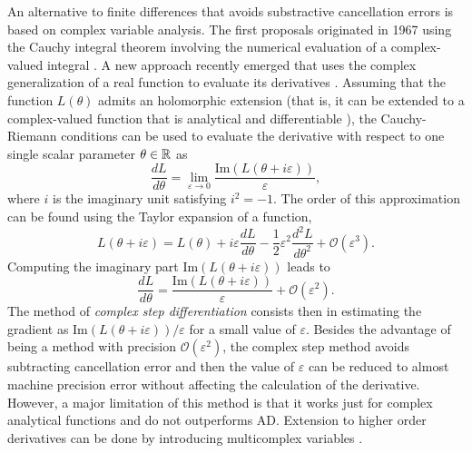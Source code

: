 An alternative to finite differences that avoids substractive cancellation errors is based on complex variable analysis. 
The first proposals originated in 1967 using the Cauchy integral theorem involving the numerical evaluation of a complex-valued integral \cite{Lyness_1967, Lyness_Moler_1967}.
A new approach recently emerged that uses the complex generalization of a real function to evaluate its derivatives \cite{Squire_Trapp_1998_complex_diff, Martins_Sturdza_Alonso_2003_complex_differentiation}. 
Assuming that the function $L(\theta)$ admits an holomorphic extension (that is, it can be extended to a complex-valued function that is analytical and differentiable \cite{stein2010complex}), the Cauchy-Riemann conditions can be used to evaluate the derivative with respect to one single scalar parameter $\theta \in \operatorname{\mathbb{R}}$ as
\begin{equation}
    \frac{dL}{d\theta} = \lim_{\varepsilon \rightarrow 0} \frac{\text{Im}(L(\theta + i \varepsilon))}{\varepsilon},
\end{equation}
where $i$ is the imaginary unit satisfying $i^2 = -1$. 
The order of this approximation can be found using the Taylor expansion of a function,
\begin{equation}
    L(\theta + i \varepsilon)
    = 
    L(\theta) + i \varepsilon \frac{dL}{d\theta} 
    - 
    \frac 1 2  \varepsilon^2
    \frac{d^2 L}{d\theta^2}
    + 
    \mathcal O (\varepsilon^3).
\end{equation}
Computing the imaginary part $\text{Im}(L(\theta + i \varepsilon))$ leads to
\begin{equation}
    \frac{dL}{d\theta} 
    = 
    \frac{\text{Im}(L(\theta + i \varepsilon))}{\varepsilon}
    + 
    \mathcal{O} (\varepsilon^2).
    \label{eq:complex-step-definition}
\end{equation}
The method of \textit{complex step differentiation} consists then in estimating the gradient as $\text{Im}(L(\theta + i \varepsilon)) / \varepsilon$ for a small value of $\varepsilon$. 
Besides the advantage of being a method with precision $\mathcal{O}(\varepsilon^2)$, the complex step method avoids subtracting cancellation error and then the value of $\varepsilon$ can be reduced to almost machine precision error without affecting the calculation of the derivative. 
However, a major limitation of this method is that it works just for complex analytical functions \cite{Martins_Sturdza_Alonso_2003_complex_differentiation} and do not outperforms AD.
Extension to higher order derivatives can be done by introducing multicomplex variables \cite{Lantoine_Russell_Dargent_2012}. 

